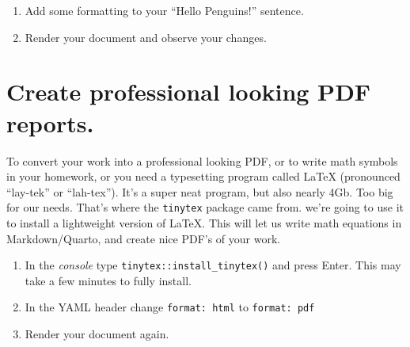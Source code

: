 \documentclass[
  letterpaper,
  DIV=11,
  numbers=noendperiod,
  oneside]{scrreprt}
\providecommand{\tightlist}{%
  \setlength{\itemsep}{0pt}\setlength{\parskip}{0pt}}\usepackage{longtable,booktabs,array}
\begin{document}
\begin{tcolorbox}[enhanced jigsaw, bottomrule=.15mm, colback=white, colframe=quarto-callout-tip-color-frame, toprule=.15mm, coltitle=black, rightrule=.15mm, opacitybacktitle=0.6, colbacktitle=quarto-callout-tip-color!10!white, toptitle=1mm, leftrule=.75mm, breakable, bottomtitle=1mm, titlerule=0mm, title={👉 Add some formatting}, arc=.35mm, left=2mm, opacityback=0]

\begin{enumerate}
\def\labelenumi{\arabic{enumi}.}
\tightlist
\item
  Add some formatting to your ``Hello Penguins!'' sentence.
\item
  Render your document and observe your changes.
\end{enumerate}

\end{tcolorbox}

\section{Create professional looking PDF
reports.}\label{create-professional-looking-pdf-reports.}

To convert your work into a professional looking PDF, or to write math
symbols in your homework, or you need a typesetting program called LaTeX
(pronounced ``lay-tek'' or ``lah-tex''). It's a super neat program, but
also nearly 4Gb. Too big for our needs. That's where the
\texttt{tinytex} package came from. we're going to use it to install a
lightweight version of LaTeX. This will let us write math equations in
Markdown/Quarto, and create nice PDF's of your work.

\begin{tcolorbox}[enhanced jigsaw, bottomrule=.15mm, colback=white, colframe=quarto-callout-tip-color-frame, toprule=.15mm, coltitle=black, rightrule=.15mm, opacitybacktitle=0.6, colbacktitle=quarto-callout-tip-color!10!white, toptitle=1mm, leftrule=.75mm, breakable, bottomtitle=1mm, titlerule=0mm, title={👉 Your Turn}, arc=.35mm, left=2mm, opacityback=0]

\begin{enumerate}
\def\labelenumi{\arabic{enumi}.}
\tightlist
\item
  In the \emph{console} type \texttt{tinytex::install\_tinytex()} and
  press Enter. This may take a few minutes to fully install.
\item
  In the YAML header change \texttt{format:\ html} to
  \texttt{format:\ pdf}
\item
  Render your document again.
\end{enumerate}

\end{tcolorbox}
\end{document}
